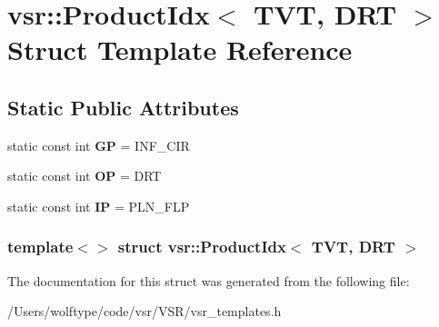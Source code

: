 \hypertarget{structvsr_1_1_product_idx_3_01_t_v_t_00_01_d_r_t_01_4}{\section{vsr\-:\-:Product\-Idx$<$ T\-V\-T, D\-R\-T $>$ Struct Template Reference}
\label{structvsr_1_1_product_idx_3_01_t_v_t_00_01_d_r_t_01_4}
}
\subsection*{Static Public Attributes}
\begin{DoxyCompactItemize}
\item 
\hypertarget{structvsr_1_1_product_idx_3_01_t_v_t_00_01_d_r_t_01_4_ab604621849b6af2fcf1e32a7e0f0f9d1}{static const int {\bfseries G\-P} = I\-N\-F\-\_\-\-C\-I\-R}\label{structvsr_1_1_product_idx_3_01_t_v_t_00_01_d_r_t_01_4_ab604621849b6af2fcf1e32a7e0f0f9d1}

\item 
\hypertarget{structvsr_1_1_product_idx_3_01_t_v_t_00_01_d_r_t_01_4_a4f9f614dc4a39881e055225f001e045a}{static const int {\bfseries O\-P} = D\-R\-T}\label{structvsr_1_1_product_idx_3_01_t_v_t_00_01_d_r_t_01_4_a4f9f614dc4a39881e055225f001e045a}

\item 
\hypertarget{structvsr_1_1_product_idx_3_01_t_v_t_00_01_d_r_t_01_4_ad42b215fa97787b7b106e3c8079cc228}{static const int {\bfseries I\-P} = P\-L\-N\-\_\-\-F\-L\-P}\label{structvsr_1_1_product_idx_3_01_t_v_t_00_01_d_r_t_01_4_ad42b215fa97787b7b106e3c8079cc228}

\end{DoxyCompactItemize}
\subsubsection*{template$<$$>$ struct vsr\-::\-Product\-Idx$<$ T\-V\-T, D\-R\-T $>$}



The documentation for this struct was generated from the following file\-:\begin{DoxyCompactItemize}
\item 
/\-Users/wolftype/code/vsr/\-V\-S\-R/vsr\-\_\-templates.\-h\end{DoxyCompactItemize}
